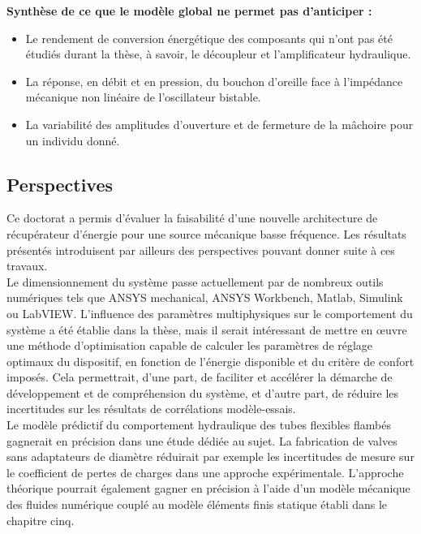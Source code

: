 \textbf{Synthèse de ce que le modèle global ne permet pas d'anticiper :}
\begin{itemize}[label=$\circ$]
      \item Le rendement de conversion énergétique des composants qui n'ont pas été étudiés durant la thèse, à savoir, le découpleur et l'amplificateur hydraulique.
      \item La réponse, en débit et en pression, du bouchon d'oreille face à l'impédance mécanique non linéaire de l'oscillateur bistable.
      \item La variabilité des amplitudes d'ouverture et de fermeture de la mâchoire pour un individu donné.
\end{itemize}

\subsection*{Perspectives}
\label{sec:conclu_Perspectives}	

Ce doctorat a permis d'évaluer la faisabilité d'une nouvelle architecture de récupérateur d'énergie pour une source mécanique basse fréquence. Les résultats présentés introduisent par ailleurs des perspectives pouvant donner suite à ces travaux.\\

Le dimensionnement du système passe actuellement par de nombreux outils numériques tels que ANSYS mechanical, ANSYS Workbench, Matlab, Simulink ou LabVIEW. L'influence des paramètres multiphysiques sur le comportement du système a été établie dans la thèse, mais il serait intéressant de mettre en \oe{}uvre une méthode d'optimisation capable de calculer les paramètres de réglage optimaux du dispositif, en fonction de l'énergie disponible et du critère de confort imposés. Cela permettrait, d'une part, de faciliter et accélérer la démarche de développement et de compréhension du système, et d'autre part, de réduire les incertitudes sur les résultats de corrélations modèle-essais.\\

Le modèle prédictif du comportement hydraulique des tubes flexibles flambés gagnerait en précision dans une étude dédiée au sujet. La fabrication de valves sans adaptateurs de diamètre réduirait par exemple les incertitudes de mesure sur le coefficient de pertes de charges dans une approche expérimentale. L'approche théorique pourrait également gagner en précision à l'aide d'un modèle mécanique des fluides numérique couplé au modèle éléments finis statique établi dans le chapitre cinq.\\

